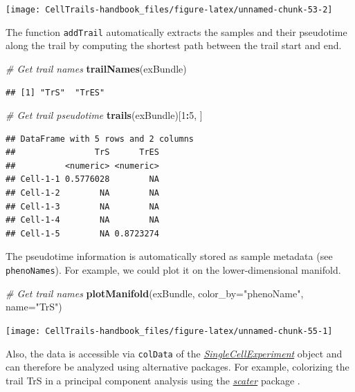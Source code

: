\documentclass[]{book}
\newenvironment{Shaded}{\begin{snugshade}}{\end{snugshade}}
\newcommand{\KeywordTok}[1]{\textcolor[rgb]{0.13,0.29,0.53}{\textbf{#1}}}
\newcommand{\DataTypeTok}[1]{\textcolor[rgb]{0.13,0.29,0.53}{#1}}
\newcommand{\DecValTok}[1]{\textcolor[rgb]{0.00,0.00,0.81}{#1}}
\newcommand{\StringTok}[1]{\textcolor[rgb]{0.31,0.60,0.02}{#1}}
\newcommand{\CommentTok}[1]{\textcolor[rgb]{0.56,0.35,0.01}{\textit{#1}}}
\newcommand{\OperatorTok}[1]{\textcolor[rgb]{0.81,0.36,0.00}{\textbf{#1}}}
\newcommand{\NormalTok}[1]{#1}
\theoremstyle{definition}
\theoremstyle{definition}
\theoremstyle{definition}
\theoremstyle{remark}
\begin{document}
\texttt{[image: CellTrails-handbook\_files/figure-latex/unnamed-chunk-53-2]}

The function \texttt{addTrail} automatically extracts the samples and
their pseudotime along the trail by computing the shortest path between
the trail start and end.

\begin{Shaded}
\begin{Highlighting}[]
\CommentTok{# Get trail names}
\KeywordTok{trailNames}\NormalTok{(exBundle)}
\end{Highlighting}
\end{Shaded}

\begin{verbatim}
## [1] "TrS"  "TrES"
\end{verbatim}

\begin{Shaded}
\begin{Highlighting}[]
\CommentTok{# Get trail pseudotime}
\KeywordTok{trails}\NormalTok{(exBundle)[}\DecValTok{1}\OperatorTok{:}\DecValTok{5}\NormalTok{, ]}
\end{Highlighting}
\end{Shaded}

\begin{verbatim}
## DataFrame with 5 rows and 2 columns
##                TrS      TrES
##          <numeric> <numeric>
## Cell-1-1 0.5776028        NA
## Cell-1-2        NA        NA
## Cell-1-3        NA        NA
## Cell-1-4        NA        NA
## Cell-1-5        NA 0.8723274
\end{verbatim}

The pseudotime information is automatically stored as sample metadata
(see \texttt{phenoNames}). For example, we could plot it on the
lower-dimensional manifold.

\begin{Shaded}
\begin{Highlighting}[]
\CommentTok{# Get trail names}
\KeywordTok{plotManifold}\NormalTok{(exBundle, }\DataTypeTok{color_by=}\StringTok{"phenoName"}\NormalTok{, }\DataTypeTok{name=}\StringTok{"TrS"}\NormalTok{)}
\end{Highlighting}
\end{Shaded}

\texttt{[image: CellTrails-handbook\_files/figure-latex/unnamed-chunk-55-1]}

Also, the data is accessible via \texttt{colData} of the
\emph{\href{http://bioconductor.org/packages/SingleCellExperiment}{SingleCellExperiment}}
object and can therefore be analyzed using alternative packages. For
example, colorizing the trail TrS in a principal component analysis
using the \emph{\href{http://bioconductor.org/packages/scater}{scater}}
package \citep{scater}.
\end{document}
